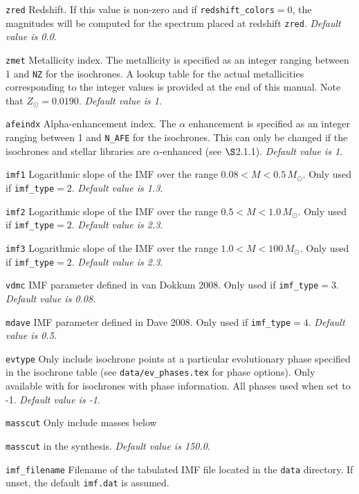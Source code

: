 \documentclass[]{article}
\newcommand{\Msun}{M_{\odot}}
\begin{document}
\begin{itemize}

\item{\texttt{zred}} Redshift.
  If this value is non-zero and if \texttt{redshift\_colors}$=0$, the magnitudes
  will be computed for the spectrum placed at redshift \texttt{zred}.
  {\it Default value is 0.0}.
\item{\texttt{zmet}} Metallicity index.
  The metallicity is specified as an integer ranging between 1 and \texttt{NZ} for the
  isochrones.  A lookup table for the actual metallicities corresponding to the
  integer values is provided at the end of this manual. Note that
  $Z_\odot=0.0190$.
  {\it Default value is 1}.
\item{\texttt{afeindx}} Alpha-enhancement index.
  The $\alpha$ enhancement is specified as an integer ranging between 1 and
  \texttt{N\_AFE} for the isochrones.  This can only be changed if the
  isochrones and stellar libraries are $\alpha$-enhanced (see $\S$2.1.1).
  {\it Default value is 1}.
\item{\texttt{imf1}} Logarithmic slope of the IMF over the range
  $0.08<M<0.5\,\Msun$.  Only used if \texttt{imf\_type}$=2$.
  {\it Default value is 1.3}.
\item{\texttt{imf2}} Logarithmic slope of the IMF over the range
  $0.5<M<1.0\,\Msun$.  Only used if \texttt{imf\_type}$=2$.
  {\it Default value is 2.3}.
\item{\texttt{imf3}} Logarithmic slope of the IMF over the range
  $1.0<M<100\,\Msun$.  Only used if \texttt{imf\_type}$=2$.
  {\it Default value is 2.3}.
\item{\texttt{vdmc}} IMF parameter defined in van Dokkum 2008.  Only
  used if \texttt{imf\_type}$=3$.
  {\it Default value is 0.08}.
\item{\texttt{mdave}} IMF parameter defined in Dave 2008.  Only
  used if \texttt{imf\_type}$=4$.  {\it Default value is 0.5}.
\item{\texttt{evtype}} Only include isochrone points at a particular
  evolutionary phase specified in the isochrone table (see
  \texttt{data/ev\_phases.tex} for phase options).  Only available with for
  isochrones with phase information.  All phases used when set to -1.
  {\it Default value is -1}.
\item{\texttt{masscut}} Only include masses below {\texttt{masscut} in the
  synthesis.
  {\it Default value is 150.0}.
\item{\texttt{imf\_filename}} Filename of the tabulated IMF file located in the
  \texttt{data} directory.  If unset, the default \texttt{imf.dat} is assumed.
}
\end{itemize}
\end{document}
